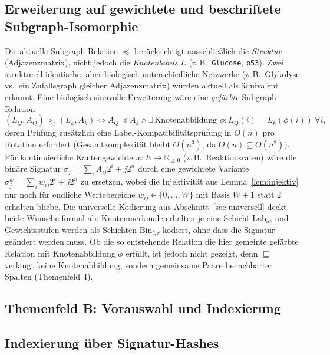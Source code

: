 \documentclass[a4paper,12pt, twoside]{report}
\theoremstyle{definition}
\begin{document}
\subsection{Erweiterung auf gewichtete und beschriftete Subgraph-Isomorphie}

Die aktuelle Subgraph-Relation $\preceq$ berücksichtigt ausschließlich die \emph{Struktur} (Adjazenzmatrix), nicht jedoch die \emph{Knotenlabels} $L$ (z.\,B.\ \texttt{Glucose}, \texttt{p53}). Zwei strukturell identische, aber biologisch unterschiedliche Netzwerke (z.\,B.\ Glykolyse vs.\ ein Zufallsgraph gleicher Adjazenzmatrix) würden aktuell als äquivalent erkannt. Eine biologisch sinnvolle Erweiterung wäre eine \emph{gefärbte} Subgraph-Relation
\[
(L_Q,A_Q)\preceq_{\ell}(L_k,A_k) \iff A_Q\preceq A_k \wedge \exists\, \text{Knotenabbildung }\phi: L_Q(i)=L_k(\phi(i))\ \forall i,
\]
deren Prüfung zusätzlich eine Label-Kompatibilitätsprüfung in $O(n)$ pro Rotation erfordert (Gesamtkomplexität bleibt $O(n^3)$, da $O(n)\subseteq O(n^2)$). Für kontinuierliche Kantengewichte $w: E\to\mathbb{R}_{\ge 0}$ (z.\,B.\ Reaktionsraten) wäre die binäre Signatur $\sigma_j=\sum_i A_{ij}2^i+j2^n$ durch eine gewichtete Variante $\sigma_j^w=\sum_i w_{ij}2^i+j2^n$ zu ersetzen, wobei die Injektivität aus Lemma~\ref{lem:injektiv} nur noch für endliche Wertebereiche $w_{ij}\in\{0,\ldots,W\}$ mit Basis $W+1$ statt $2$ erhalten bliebe. Die universelle Kodierung aus Abschnitt~\ref{sec:universell} deckt beide Wünsche formal ab: Knotenmerkmale erhalten je eine Schicht $\mathrm{Lab}_a$, und Gewichtsstufen werden als Schichten $\mathrm{Bin}_{t,r}$ kodiert, ohne dass die Signatur geändert werden muss. Ob die so entstehende Relation die hier gemeinte gefärbte Relation mit Knotenabbildung $\phi$ erfüllt, ist jedoch nicht gezeigt, denn $\sqsubseteq$ verlangt keine Knotenabbildung, sondern gemeinsame Paare benachbarter Spalten (Themenfeld~I).


\subsection*{Themenfeld B: Vorauswahl und Indexierung}

\subsection{Indexierung über Signatur-Hashes}
\end{document}
